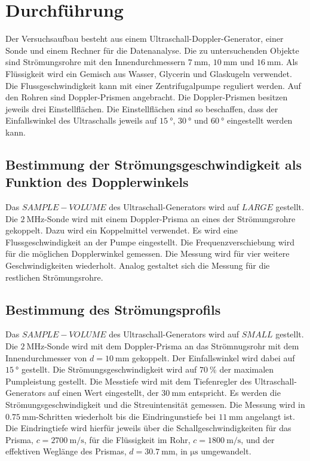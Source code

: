 \section{Durchführung}
\label{sec:Durchführung}
Der Versuchsaufbau besteht aus einem Ultraschall-Doppler-Generator, einer Sonde und einem Rechner für die Datenanalyse.
Die zu untersuchenden Objekte sind Strömungsrohre mit den Innendurchmessern $\SI{7}{\milli\meter}$, $\SI{10}{\milli\meter}$ und $\SI{16}{\milli\meter}$.
Als Flüssigkeit wird ein Gemisch aus Wasser, Glycerin und Glaskugeln verwendet.
Die Flussgeschwindigkeit kann mit einer Zentrifugalpumpe reguliert werden.
Auf den Rohren sind Doppler-Prismen angebracht.
Die Doppler-Prismen besitzen jeweils drei Einstellflächen.
Die Einstellflächen sind so beschaffen, dass der Einfallswinkel des Ultraschalls jeweils auf $\SI{15}{\degree}$, $\SI{30}{\degree}$ und $\SI{60}{\degree}$ eingestellt werden kann.
\subsection{Bestimmung der Strömungsgeschwindigkeit als Funktion des Dopplerwinkels}
Das $SAMPLE-VOLUME$ des Ultraschall-Generators wird auf $LARGE$ gestellt.
Die $\SI{2}{\mega\hertz}$-Sonde wird mit einem Doppler-Prisma an eines der Strömungsrohre gekoppelt.
Dazu wird ein Koppelmittel verwendet.
Es wird eine Flussgeschwindigkeit an der Pumpe eingestellt.
Die Frequenzverschiebung wird für die möglichen Dopplerwinkel gemessen.
Die Messung wird für vier weitere Geschwindigkeiten wiederholt.
Analog gestaltet sich die Messung für die restlichen Strömungsrohre.
\subsection{Bestimmung des Strömungsprofils}
Das $SAMPLE-VOLUME$ des Ultraschall-Generators wird auf $SMALL$ gestellt.
Die $\SI{2}{\mega\hertz}$-Sonde wird mit dem Doppler-Prisma an das Strömnugsrohr mit dem Innendurchmesser von $d= \SI{10}{\milli\meter}$ gekoppelt.
Der Einfallswinkel wird dabei auf $\SI{15}{\degree}$ gestellt.
Die Strömungsgeschwindigkeit wird auf $\SI{70}{\percent}$ der maximalen Pumpleistung gestellt.
Die Messtiefe wird mit dem Tiefenregler des Ultraschall-Generators auf einen Wert eingestellt, der $\SI{30}{\milli\meter}$ entspricht.
Es werden die Strömungsgeschwindigkeit und die Streuintensität gemessen.
Die Messung wird in $\SI{0.75}{\milli\meter}$-Schritten wiederholt bis die Eindringunstiefe bei $\SI{11}{\milli\meter}$ angelangt ist.
Die Eindringtiefe wird hierfür jeweils über die Schallgeschwindigkeiten für das Prisma,
$c=\SI{2700}{\meter\per\second}$\cite{us3}, für die Flüssigkeit im Rohr,
$c=\SI{1800}{\meter\per\second}$\cite{us3}, und der effektiven Weglänge des Prismas, $d=\SI{30.7}{\milli\meter}$,
in $\si{\micro\second}$ umgewandelt.
